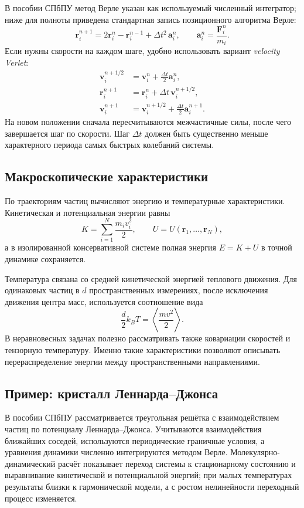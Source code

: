 В пособии СПбПУ метод Верле указан как используемый численный интегратор; ниже для полноты приведена стандартная запись позиционного алгоритма Верле:
\[
    \mathbf r_i^{n+1}
    =2\mathbf r_i^n-\mathbf r_i^{n-1}
     +\Delta t^2\,\mathbf a_i^n,
    \qquad
    \mathbf a_i^n=\frac{\mathbf F_i^n}{m_i}.
\]
Если нужны скорости на каждом шаге, удобно использовать вариант
\emph{velocity Verlet}:
\[
\begin{aligned}
    \mathbf v_i^{n+1/2}&=\mathbf v_i^n
        +\frac{\Delta t}{2}\mathbf a_i^n,\\
    \mathbf r_i^{n+1}&=\mathbf r_i^n
        +\Delta t\,\mathbf v_i^{n+1/2},\\
    \mathbf v_i^{n+1}&=\mathbf v_i^{n+1/2}
        +\frac{\Delta t}{2}\mathbf a_i^{n+1}.
\end{aligned}
\]
На новом положении сначала пересчитываются межчастичные силы, после чего
завершается шаг по скорости. Шаг $\Delta t$ должен быть существенно меньше
характерного периода самых быстрых колебаний системы.

\subsection{Макроскопические характеристики}

По траекториям частиц вычисляют энергию и температурные характеристики.
Кинетическая и потенциальная энергии равны
\[
    K=\sum_{i=1}^{N}\frac{m_i v_i^2}{2},
    \qquad
    U=U(\mathbf r_1,\ldots,\mathbf r_N),
\]
а в изолированной консервативной системе полная энергия
$E=K+U$ в точной динамике сохраняется.

Температура связана со средней кинетической энергией теплового движения. Для
одинаковых частиц в $d$ пространственных измерениях, после исключения движения
центра масс, используется соотношение вида
\[
    \frac{d}{2}k_B T
    =\left\langle\frac{m v^2}{2}\right\rangle.
\]
В неравновесных задачах полезно рассматривать также ковариации скоростей и
тензорную температуру. Именно такие характеристики позволяют описывать
перераспределение энергии между пространственными направлениями.

\subsection{Пример: кристалл Леннарда--Джонса}

В пособии СПбПУ рассматривается треугольная решётка с взаимодействием
частиц по потенциалу Леннарда--Джонса. Учитываются взаимодействия
ближайших соседей, используются периодические граничные условия, а уравнения
динамики численно интегрируются методом Верле. Молекулярно-динамический расчёт
показывает переход системы к стационарному состоянию и выравнивание
кинетической и потенциальной энергий; при малых температурах результаты близки
к гармонической модели, а с ростом нелинейности переходный процесс изменяется.

